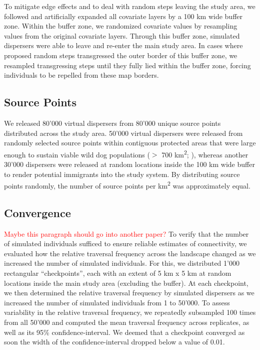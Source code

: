 \documentclass[abstract=on,10pt,a4paper,bibliography=totocnumbered]{article}
\begin{document}
To mitigate edge effects and to deal with random steps leaving the study area,
we followed \cite{Koen.2010} and artificially expanded all covariate layers by
a 100 km wide buffer zone. Within the buffer zone, we randomized covariate
values by resampling values from the original covariate layers. Through this
buffer zone, simulated dispersers were able to leave and re-enter the main study
area. In cases where proposed random steps transgressed the outer border of this
buffer zone, we resampled transgressing steps until they fully lied within the
buffer zone, forcing individuals to be repelled from these map borders.

\subsection{Source Points}
We released 80'000 virtual dispersers from 80'000 unique source points
distributed across the study area. 50'000 virtual dispersers were released from
randomly selected source points within contiguous protected areas that were
large enough to sustain viable wild dog populations (\(>\) 700
km\textsuperscript{2}; \citealp{Pomilia.2015}), whereas another 30'000
dispersers were released at random locations inside the 100 km wide buffer to
render potential immigrants into the study system. By distributing source points
randomly, the number of source points per km\textsuperscript{2} was
approximately equal.

\subsection{Convergence}
\textcolor{red}{Maybe this paragraph should go into another paper?} To verify
that the number of simulated individuals sufficed to ensure reliable estimates
of connectivity, we evaluated how the relative traversal frequency across the
landscape changed as we increased the number of simulated individuals. For this,
we distributed 1'000 rectangular ``checkpoints'', each with an extent of 5 km x
5 km at random locations inside the main study area (excluding the buffer). At
each checkpoint, we then determined the relative traversal frequency by
simulated dispersers as we increased the number of simulated individuals from 1
to 50'000. To assess variability in the relative traversal frequency, we
repeatedly subsampled 100 times from all 50'000 and computed the mean traversal
frequency across replicates, as well as its 95\% confidence-interval. We deemed
that a checkpoint converged as soon the width of the confidence-interval dropped
below a value of 0.01.
\end{document}
